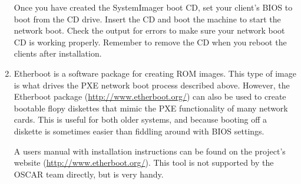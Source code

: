 \begin{enumerate}
  Once you have created the SystemImager boot CD, set your
  client's BIOS to boot from the CD drive. Insert the CD and
  boot the machine to start the network boot. Check the output for
  errors to make sure your network boot CD is working properly.
  Remember to remove the CD when you reboot the clients after
  installation.

\item {} Etherboot is a software package
  for creating ROM images.  This type of image is what drives the PXE
  network boot process described above.  However, the Etherboot
  package (\url{http://www.etherboot.org/}) can also be used to create
  bootable flopy diskettes that mimic the PXE functionality of many
  network cards.  This is useful for both older systems, and because
  booting off a diskette is sometimes easier than fiddling around with
  BIOS settings.

  A users manual with installation instructions can be found on the
  project's website (\url{http://www.etherboot.org/}). This tool is
  not supported by the OSCAR team directly, but is very handy.

\end{enumerate}

